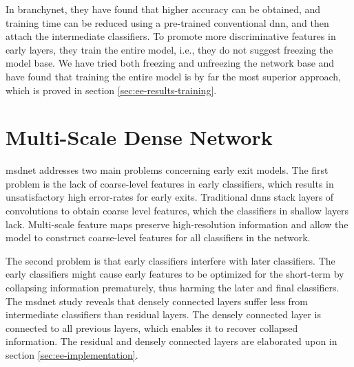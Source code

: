 In \gls{branchynet}, they have found that higher accuracy can be obtained, and training time can be reduced using a pre-trained conventional \gls{dnn}, and then attach the intermediate classifiers. To promote more discriminative features in early layers, they train the entire model, i.e., they do not suggest freezing the model base. We have tried both freezing and unfreezing the network base and have found that training the entire model is by far the most superior approach, which is proved in section \ref{sec:ee-results-training}.

\section{Multi-Scale Dense Network} \label{sec:ee-msdnet}

\gls{msdnet} \cite{huang_densely_2016} addresses two main problems concerning early exit models. The first problem is the lack of coarse-level features in early classifiers, which results in unsatisfactory high error-rates for early exits. Traditional \gls{dnn}s stack layers of convolutions to obtain coarse level features, which the classifiers in shallow layers lack. Multi-scale feature maps preserve high-resolution information and allow the model to construct coarse-level features for all classifiers in the network. 

The second problem is that early classifiers interfere with later classifiers. The early classifiers might cause early features to be optimized for the short-term by collapsing information prematurely, thus harming the later and final classifiers. The \gls{msdnet} \cite{huang_multi-scale_2017} study reveals that densely connected layers suffer less from intermediate classifiers than residual layers. The densely connected layer is connected to all previous layers, which enables it to recover collapsed information. The residual and densely connected layers are elaborated upon in section \ref{sec:ee-implementation}.


